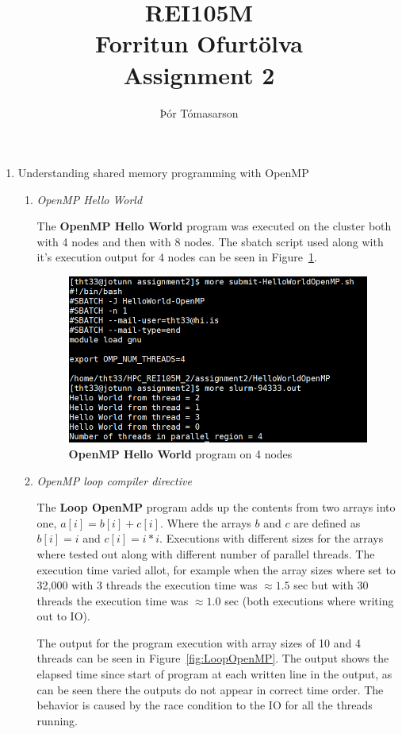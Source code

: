 \documentclass[a4paper]{article}
\title{REI105M\\Forritun Ofurtölva\\Assignment 2}
\author{Þór Tómasarson}
\begin{document}
\maketitle


\begin{enumerate}
    \item
    Understanding shared memory programming with OpenMP
    \begin{enumerate}
    \item
    \textit{OpenMP Hello World}

    The \textbf{OpenMP Hello World} program was executed on the cluster both with 4 nodes and then with 8 nodes. The sbatch script used along with it’s execution output for 4 nodes can be seen in Figure~\ref{fig:helloworld}.
    
    \begin{figure}[H]
        \centering
        \includegraphics[scale=0.7]{images/HelloWorld}
        \caption{\label{fig:helloworld}\textbf{OpenMP Hello World} program on 4 nodes}
    \end{figure}

    \item
    \textit{OpenMP loop compiler directive}
    
    The \textbf{Loop OpenMP} program adds up the contents from two arrays into one, $a[i] = b[i] + c[i]$. Where the arrays $b$ and $c$ are defined as $b[i] = i$ and $c[i] = i*i$. Executions with different sizes for the arrays where tested out along with different number of parallel threads. The execution time varied allot, for example when the array sizes where set to 32,000 with 3 threads the execution time was $\approx1.5$ sec but with 30 threads the execution time was $\approx 1.0$ sec (both executions where writing out to IO).

    The output for the program execution with array sizes of 10 and 4 threads can be seen in Figure~\ref{fig:LoopOpenMP}. The output shows the elapsed time since start of program at each written line in the output, as can be seen there the outputs do not appear in correct time order. The behavior is caused by the race condition to the IO for all the threads running.


\end{enumerate}
\end{enumerate}
\end{document}
